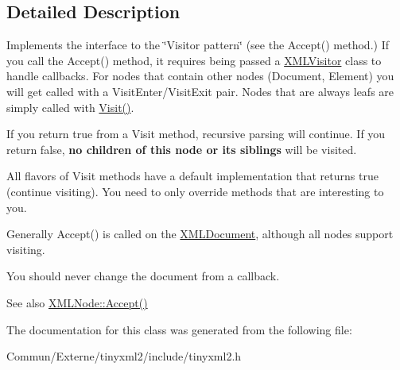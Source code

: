 \subsection{Detailed Description}
Implements the interface to the \char`\"{}\+Visitor pattern\char`\"{} (see the Accept() method.) If you call the Accept() method, it requires being passed a \hyperlink{classtinyxml2_1_1_x_m_l_visitor}{X\+M\+L\+Visitor} class to handle callbacks. For nodes that contain other nodes (Document, Element) you will get called with a Visit\+Enter/\+Visit\+Exit pair. Nodes that are always leafs are simply called with \hyperlink{classtinyxml2_1_1_x_m_l_visitor_adc75bd459fc7ba8223b50f0616767f9a}{Visit()}.

If you return \textquotesingle{}true\textquotesingle{} from a Visit method, recursive parsing will continue. If you return false, {\bfseries no children of this node or its siblings} will be visited.

All flavors of Visit methods have a default implementation that returns \textquotesingle{}true\textquotesingle{} (continue visiting). You need to only override methods that are interesting to you.

Generally Accept() is called on the \hyperlink{classtinyxml2_1_1_x_m_l_document}{X\+M\+L\+Document}, although all nodes support visiting.

You should never change the document from a callback.

\begin{DoxySeeAlso}{See also}
\hyperlink{classtinyxml2_1_1_x_m_l_node_a366ad0e9b9ae8d1b18c00f903994b7a9}{X\+M\+L\+Node\+::\+Accept()} 
\end{DoxySeeAlso}


The documentation for this class was generated from the following file\+:\begin{DoxyCompactItemize}
\item 
Commun/\+Externe/tinyxml2/include/tinyxml2.\+h\end{DoxyCompactItemize}

